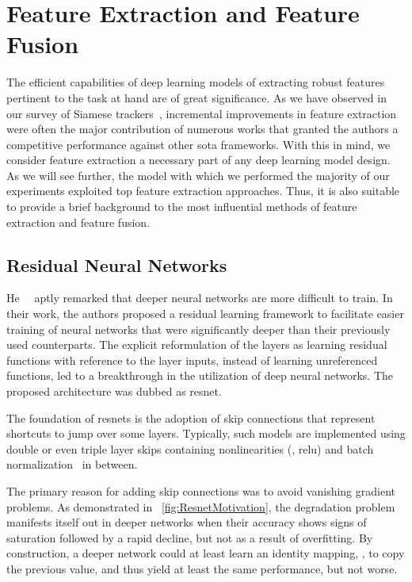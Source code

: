 \section{Feature Extraction and Feature Fusion}
\label{sec:FeatureExtractionFusion}

The efficient capabilities of deep learning models of extracting robust features pertinent to the task at hand are of great significance. As we have observed in our survey of Siamese trackers~\cite{ondrasovic2021siamese}, incremental improvements in feature extraction were often the major contribution of numerous works that granted the authors a competitive performance against other \gls{sota} frameworks. With this in mind, we consider feature extraction a necessary part of any deep learning model design. As we will see further, the model with which we performed the majority of our experiments exploited top feature extraction approaches. Thus, it is also suitable to provide a brief background to the most influential methods of feature extraction and feature fusion.

\subsection{Residual Neural Networks}
\label{ssec:ResidualNeuralNetworks}

He~\etal{}~\cite{he2015resnet} aptly remarked that deeper neural networks are more difficult to train. In their work, the authors proposed a residual learning framework to facilitate easier training of neural networks that were significantly deeper than their previously used counterparts. The explicit reformulation of the layers as learning residual functions with reference to the layer inputs, instead of learning unreferenced functions, led to a breakthrough in the utilization of deep neural networks. The proposed architecture was dubbed as \gls{resnet}.

The foundation of \glspl{resnet} is the adoption of skip connections that represent shortcuts to jump over some layers. Typically, such models are implemented using double or even triple layer skips containing nonlinearities (\egtext{}, \gls{relu}) and batch normalization~\cite{ioffe2015batchnorm} in between.

The primary reason for adding skip connections was to avoid vanishing gradient problems. As demonstrated in \figtext{}~\ref{fig:ResnetMotivation}, the degradation problem manifests itself out in deeper networks when their accuracy shows signs of saturation followed by a rapid decline, but not as a result of overfitting. By construction, a deeper network could at least learn an identity mapping, \ietext{}, to copy the previous value, and thus yield at least the same performance, but not worse.

